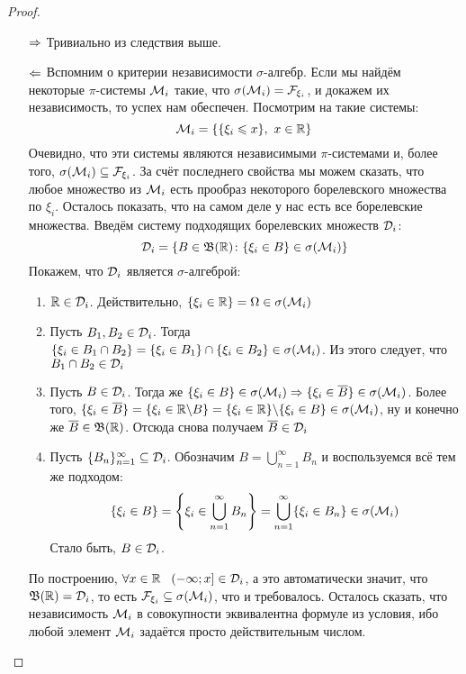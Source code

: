 \begin{proof}~
	\begin{itemize}
		\item[$\Rightarrow$] Тривиально из следствия выше.
		
		\item[$\Leftarrow$] Вспомним о критерии независимости $\sigma$-алгебр. Если мы найдём некоторые $\pi$-системы $\mathcal{M}_i$ такие, что $\sigma(\mathcal{M}_i) = \mathcal{F}_{\xi_i}$, и докажем их независимость, то успех нам обеспечен. Посмотрим на такие системы:
		\[
			\mathcal{M}_i = \{\{\xi_i \leqslant x\},\ x \in \mathbb{R}\}
		\]
		Очевидно, что эти системы являются независимыми $\pi$-системами и, более того, $\sigma(\mathcal{M}_i) \subseteq \mathcal{F}_{\xi_i}$. За счёт последнего свойства мы можем сказать, что любое множество из $\mathcal{M}_i$ есть прообраз некоторого борелевского множества по $\xi_i$. Осталось показать, что на самом деле у нас есть все борелевские множества. Введём систему подходящих борелевских множеств $\mathcal{D}_i$:
		\[
			\mathcal{D}_i = \{B \in \mathfrak{B}(\mathbb{R}) \colon \{\xi_i \in B\} \in \sigma(\mathcal{M}_i)\}
		\]
		Покажем, что $\mathcal{D}_i$ является $\sigma$-алгеброй:
		\begin{enumerate}
			\item $\mathbb{R} \in \mathcal{D}_i$. Действительно, $\{\xi_i \in \mathbb{R}\} = \Omega \in \sigma(\mathcal{M}_i)$
			
			\item Пусть $B_1, B_2 \in \mathcal{D}_i$. Тогда $\{\xi_i \in B_1 \cap B_2\} = \{\xi_i \in B_1\} \cap \{\xi_i \in B_2\} \in \sigma(\mathcal{M}_i)$. Из этого следует, что $B_1 \cap B_2 \in \mathcal{D}_i$
			
			\item Пусть $B \in \mathcal{D}_i$. Тогда же $\{\xi_i \in B\} \in \sigma(\mathcal{M}_i) \Rightarrow \{\xi_i \in \overline{B}\} \in \sigma(\mathcal{M}_i)$. Более того, $\{\xi_i \in \overline{B}\} = \{\xi_i \in \mathbb{R} \backslash B\} = \{\xi_i \in \mathbb{R}\} \backslash \{\xi_i \in B\} \in \sigma(\mathcal{M}_i)$, ну и конечно же $\overline{B} \in \mathfrak{B}(\mathbb{R})$. Отсюда снова получаем $\overline{B} \in \mathcal{D}_i$
			
			\item Пусть $\{B_n\}_{n = 1}^\infty \subseteq \mathcal{D}_i$. Обозначим $B = \bigcup_{n = 1}^\infty B_n$ и воспользуемся всё тем же подходом:
			\[
				\{\xi_i \in B\} = \left\{\xi_i \in \bigcup_{n = 1}^\infty B_n\right\} = \bigcup_{n = 1}^\infty \{\xi_i \in B_n\} \in \sigma(\mathcal{M}_i)
			\]
			Стало быть, $B \in \mathcal{D}_i$.
		\end{enumerate}
		По построению, $\forall x \in \R\ \ \rsi{-\infty; x} \in \cD_i$, а это автоматически значит, что $\mathfrak{B}(\mathbb{R}) = \mathcal{D}_i$, то есть $\mathcal{F}_{\xi_i} \subseteq \sigma(\mathcal{M}_i)$, что и требовалось. Осталось сказать, что независимость $\mathcal{M}_i$ в совокупности эквивалентна формуле из условия, ибо любой элемент $\mathcal{M}_i$ задаётся просто действительным числом.
	\end{itemize}
\end{proof}